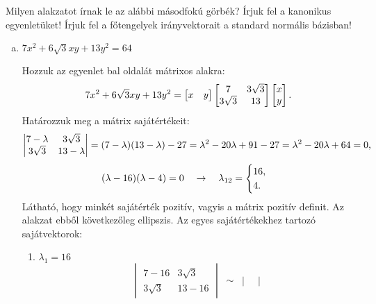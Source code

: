 \documentclass[exercise]{math-standalone}
\begin{document}
\begin{exercise}{%
    Milyen alakzatot írnak le az alábbi másodfokú görbék?
    Írjuk fel a kanonikus egyenletüket!
    Írjuk fel a főtengelyek irányvektorait a standard normális bázisban!
  }
{\begin{enumerate}[a)]
            \begin{center}
            \end{center}

            \tcbline
      \item $7x^2 + 6\sqrt{3} xy + 13y^2 = 64$

            Hozzuk az egyenlet bal oldalát mátrixos alakra:
            \[
              7x^2 + 6\sqrt{3} xy + 13y^2 =
              \begin{bmatrix} x & y \end{bmatrix}
              \begin{bmatrix} 7 & 3\sqrt{3} \\ 3\sqrt{3} & 13 \end{bmatrix}
              \begin{bmatrix} x \\ y \end{bmatrix}
              \text.
            \]
            Határozzuk meg a mátrix sajátértékeit:
            \[
              \begin{vmatrix} 7 - \lambda & 3\sqrt{3} \\ 3\sqrt{3} & 13 - \lambda \end{vmatrix}
              = (7 - \lambda)(13 - \lambda) - 27
              = \lambda^2 - 20 \lambda + 91 - 27
              = \lambda^2 - 20 \lambda + 64
              = 0
              \text,
            \]
            \[
              (\lambda - 16)(\lambda - 4) = 0
              \quad \rightarrow \quad
              \lambda_{12} = \begin{cases}
                16 \text, \\
                4 \text.
              \end{cases}
            \]
            Látható, hogy minkét sajátérték pozitív, vagyis a mátrix pozitív
            definit. Az alakzat ebből következőleg ellipszis.
            Az egyes sajátértékekhez tartozó sajátvektorok:
            \begin{enumerate}[1)]
              \item $\lambda_1 = 16$
                    \[
                      \begin{vmatrix}
                        7 - 16     & 3 \sqrt{3} \\
                        3 \sqrt{3} & 13 - 16
                      \end{vmatrix} \;\sim\; \begin{vmatrix}

\end{vmatrix}\]
\end{enumerate}
\end{enumerate}}
\end{exercise}
\end{document}

